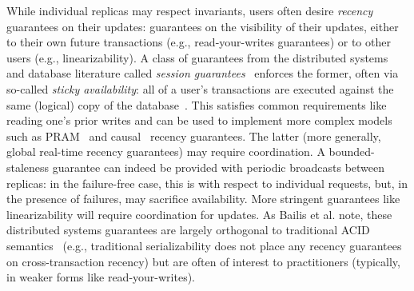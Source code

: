  While individual replicas may respect
invariants, users often desire \textit{recency} guarantees on their
updates: guarantees on the visibility of their updates, either to
their own future transactions (e.g., read-your-writes guarantees) or
to other users (e.g., linearizability). A class of guarantees from the
distributed systems and database literature called \textit{session
  guarantees}~\cite{bayou} enforces the former, often via so-called
\textit{sticky availability}: all of a user's transactions are
executed against the same (logical) copy of the
database~\cite{hat-vldb}. This satisfies common requirements like
reading one's prior writes and can be used to implement more complex
models such as PRAM~\cite{pram} and causal~\cite{lamportclocks}
recency guarantees. The latter (more generally, global real-time
recency guarantees) may require coordination. A bounded-staleness
guarantee can indeed be provided with periodic broadcasts between
replicas: in the failure-free case, this is \cfree with respect to
individual requests, but, in the presence of failures, may sacrifice
availability. More stringent guarantees like linearizability will
require coordination for updates. As Bailis et al. note, these
distributed systems guarantees are largely orthogonal to traditional
ACID semantics~\cite{hat-vldb} (e.g., traditional serializability does
not place any recency guarantees on cross-transaction recency) but are
often of interest to practitioners (typically, in weaker forms like
read-your-writes).
